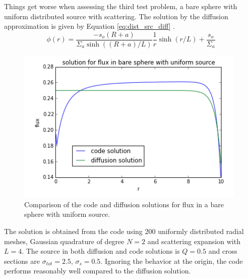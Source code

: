 \documentclass[11pt, oneside]{article}   	%
\begin{document}
Things get worse when assessing the third test problem, a bare sphere with uniform distributed source with scattering. The solution by the diffusion approximation is given by Equation \ref{eq:dist_src_diff} \cite{lewis_fundamentals}.
%
\begin{equation}\label{eq:dist_src_diff}
\phi(r) = \frac{-s_o(R+a)}{\Sigma_a \sinh((R+a)/L)}\frac{1}{r}\sinh(r/L)+\frac{s_o}{\Sigma_a}
\end{equation}
%
\begin{figure}
\centering
\includegraphics[width=11cm]{uniform_src}
\caption{Comparison of the code and diffusion solutions for flux in a bare sphere with uniform source.}
\label{fig:uniform_src_comp}
\end{figure}
%
The solution is obtained from the code using 200 uniformly distributed radial meshes, Gaussian quadrature of degree $N=2$ and scattering expansion with $L=4$. The source in both diffusion and code solutions is $Q=0.5$ and cross sections are $\sigma_{tot} = 2.5$, $\sigma_s = 0.5$. Ignoring the behavior at the origin, the code performs reasonably well compared to the diffusion solution. 
\end{document}
